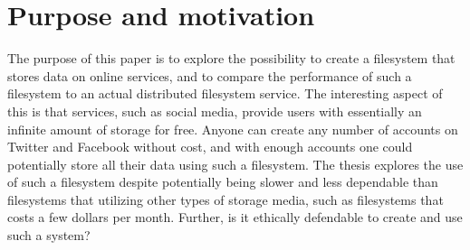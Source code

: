 
\section{Purpose and motivation}

The purpose of this paper is to explore the possibility to create a filesystem that stores data on online services, and to compare the performance of such a filesystem to an actual distributed filesystem service. The interesting aspect of this is that services, such as social media, provide users with essentially an infinite amount of storage for free. Anyone can create any number of accounts on Twitter and Facebook without cost, and with enough accounts one could potentially store all their data using such a filesystem. The thesis explores the use of such a filesystem despite potentially being slower and less dependable than filesystems that utilizing other types of storage media, such as filesystems that costs a few dollars per month. Further, is it ethically defendable to create and use such a system?

